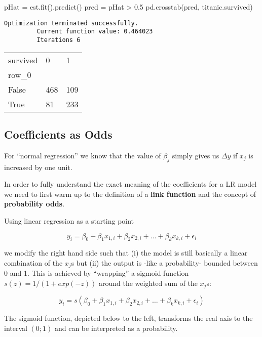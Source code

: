 \documentclass[
  letterpaper,
  DIV=11,
  numbers=noendperiod]{scrreprt}
\newenvironment{Shaded}{\begin{snugshade}}{\end{snugshade}}
\newcommand{\FloatTok}[1]{\textcolor[rgb]{0.68,0.00,0.00}{#1}}
\newcommand{\NormalTok}[1]{\textcolor[rgb]{0.00,0.23,0.31}{#1}}
\newcommand{\OperatorTok}[1]{\textcolor[rgb]{0.37,0.37,0.37}{#1}}
\begin{document}
\begin{Shaded}
\begin{Highlighting}[]
\NormalTok{pHat }\OperatorTok{=}\NormalTok{ est.fit().predict()}
\NormalTok{pred }\OperatorTok{=}\NormalTok{ pHat }\OperatorTok{\textgreater{}} \FloatTok{0.5}
\NormalTok{pd.crosstab(pred, titanic.survived)}
\end{Highlighting}
\end{Shaded}

\begin{verbatim}
Optimization terminated successfully.
         Current function value: 0.464023
         Iterations 6
\end{verbatim}

\begin{longtable}[]{@{}lll@{}}
\toprule()
survived & 0 & 1 \\
row\_0 & & \\
\midrule()
\endhead
False & 468 & 109 \\
True & 81 & 233 \\
\bottomrule()
\end{longtable}

\hypertarget{coefficients-as-odds}{%
\subsection{Coefficients as Odds}\label{coefficients-as-odds}}

For ``normal regression'' we know that the value of \(\beta_j\) simply
gives us \(\Delta y\) if \(x_j\) is increased by one unit.

In order to fully understand the exact meaning of the coefficients for a
LR model we need to first warm up to the definition of a \textbf{link
function} and the concept of \textbf{probability odds}.

Using linear regression as a starting point

\[
y_i = \beta_0 + \beta_1 x_{1,i} + \beta_2 x_{2,i} + \ldots +\beta_k x_{k,i} + \epsilon_i
\]

we modify the right hand side such that (i) the model is still basically
a linear combination of the \(x_j\)s but (ii) the output is -like a
probability- bounded between 0 and 1. This is achieved by ``wrapping'' a
sigmoid function \(s(z) = 1/(1+exp(-z))\) around the weighted sum of the
\(x_j\)s:

\[
y_i = s(\beta_0 + \beta_1 x_{1,i} + \beta_2 x_{2,i} + \ldots +\beta_k x_{k,i} + \epsilon_i)
\]

The sigmoid function, depicted below to the left, transforms the real
axis to the interval \((0;1)\) and can be interpreted as a probability.
\end{document}
